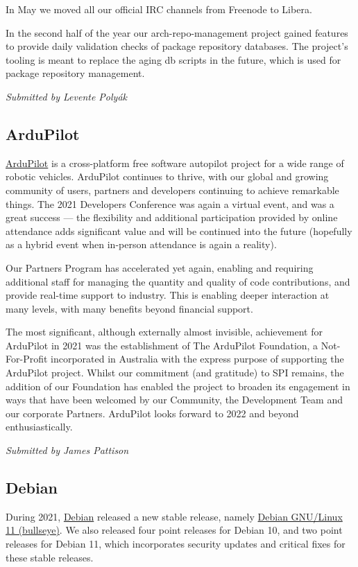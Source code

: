 \documentclass[a4paper]{report}
\begin{document}
In May we moved all our official IRC channels from Freenode to Libera.

In the second half of the year our arch-repo-management project gained features to provide daily validation checks of package repository databases.  The project's tooling is meant to replace the aging db scripts in the future, which is used for package repository management.

{\em Submitted by Levente Polyák}

\subsection{ArduPilot}

\href{https://ardupilot.org/}{ArduPilot} is a cross-platform free software autopilot project for a wide range of robotic vehicles. ArduPilot continues to thrive, with our global and growing community of users, partners and developers continuing to achieve remarkable things. The 2021 Developers Conference was again a virtual event, and was a great success --- the flexibility and additional participation provided by online attendance adds significant value and will be continued into the future (hopefully as a hybrid event when in-person attendance is again a reality).

Our Partners Program has accelerated yet again, enabling and requiring additional staff for managing the quantity and quality of code contributions, and provide real-time support to industry. This is enabling deeper interaction at many levels, with many benefits beyond financial support.

The most significant, although externally almost invisible, achievement for ArduPilot in 2021 was the establishment of The ArduPilot Foundation, a Not-For-Profit incorporated in Australia with the express purpose of supporting the ArduPilot project.  Whilst our commitment (and gratitude) to SPI remains, the addition of our Foundation has enabled the project to broaden its engagement in ways that have been welcomed by our Community, the Development Team and our corporate Partners.  ArduPilot looks forward to 2022 and beyond enthusiastically.

{\em Submitted by James Pattison}

\subsection{Debian}

During 2021, \href{https://debian.org/}{Debian} released a new stable release, namely \href{https://www.debian.org/News/2021/20210814}{Debian GNU/Linux 11 (bullseye)}. We also released four point releases for Debian 10, and two point releases for Debian 11, which incorporates security updates and critical fixes for these stable releases.
\end{document}
